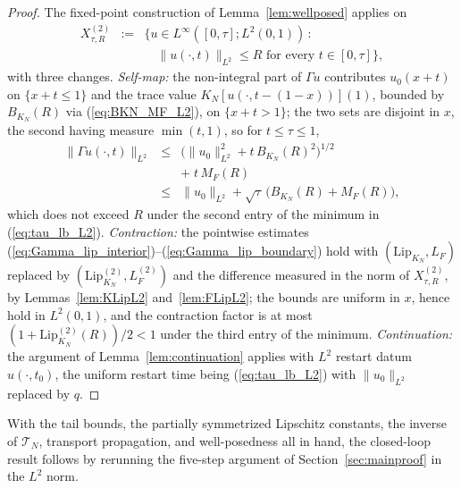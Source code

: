 \documentclass[10pt,a4paper]{amsart}
\newcommand{\Tcal}{\mathcal{T}}
\newcommand{\Linf}{L^\infty}
\newcommand{\Ltwo}{L^2}
\newcommand{\LipKn}{\mathrm{Lip}_{K_N}}
\begin{document}
\begin{proof}
The fixed-point construction of Lemma~\ref{lem:wellposed} applies on
\begin{eqnarray}
X^{(2)}_{\tau,R} &:=& \bigl\{u \in \Linf([0,\tau]; \Ltwo(0,1)) \,:\, \nonumber \\
&& \quad \|u(\cdot,t)\|_{\Ltwo} \le R \text{ for every } t \in [0,\tau]\bigr\},
\label{eq:X2def}
\end{eqnarray}
with three changes. \emph{Self-map:} the non-integral part of $\Gamma u$ contributes $u_0(x+t)$ on $\{x + t \le 1\}$ and the trace value $K_N[u(\cdot, t-(1-x))](1)$, bounded by $B_{K_N}(R)$ via (\ref{eq:BKN_MF_L2}), on $\{x + t > 1\}$; the two sets are disjoint in $x$, the second having measure $\min(t,1)$, so for $t \le \tau \le 1$,
\begin{eqnarray}
\|\Gamma u(\cdot,t)\|_{\Ltwo} &\le& \bigl(\|u_0\|_{\Ltwo}^2 + t\, B_{K_N}(R)^2\bigr)^{1/2} \nonumber \\
&& +\; t\, M_F(R) \nonumber \\
&\le& \|u_0\|_{\Ltwo} + \sqrt{\tau}\,\bigl(B_{K_N}(R) + M_F(R)\bigr),
\label{eq:selfmapL2}
\end{eqnarray}
which does not exceed $R$ under the second entry of the minimum in (\ref{eq:tau_lb_L2}). \emph{Contraction:} the pointwise estimates (\ref{eq:Gamma_lip_interior})--(\ref{eq:Gamma_lip_boundary}) hold with $(\LipKn, L_F)$ replaced by $(\LipKn^{(2)}, L_F^{(2)})$ and the difference measured in the norm of $X^{(2)}_{\tau,R}$, by Lemmas~\ref{lem:KLipL2} and~\ref{lem:FLipL2}; the bounds are uniform in $x$, hence hold in $\Ltwo(0,1)$, and the contraction factor is at most $(1 + \LipKn^{(2)}(R))/2 < 1$ under the third entry of the minimum. \emph{Continuation:} the argument of Lemma~\ref{lem:continuation} applies with $\Ltwo$ restart datum $u(\cdot,t_0)$, the uniform restart time being (\ref{eq:tau_lb_L2}) with $\|u_0\|_{\Ltwo}$ replaced by $q$.
\end{proof}

With the tail bounds, the partially symmetrized Lipschitz constants, the inverse of $\Tcal_N$, transport propagation, and well-posedness all in hand, the closed-loop result follows by rerunning the five-step argument of Section~\ref{sec:mainproof} in the $\Ltwo$ norm.
\end{document}
